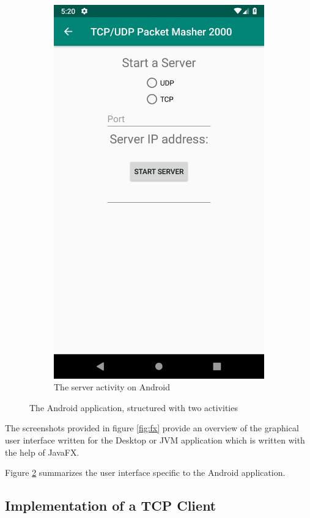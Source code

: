 \begin{figure}[H]
\begin{subfigure}{.49\textwidth}
		\includegraphics[width=0.75\linewidth]{images/task1/serverAndroid.png}
		\caption{The server activity on Android}
		\label{fig:serverAndroid}
	\end{subfigure}
	\caption{The Android application, structured with two activities}
	\label{fig:android}
\end{figure}

The screenshots provided in figure \ref{fig:fx} provide an overview of the graphical user interface written for the Desktop or JVM application which  is written with the help of JavaFX. 

Figure \ref{fig:android} summarizes the user interface specific to the Android application. 



\subsection{Implementation of a TCP Client}


